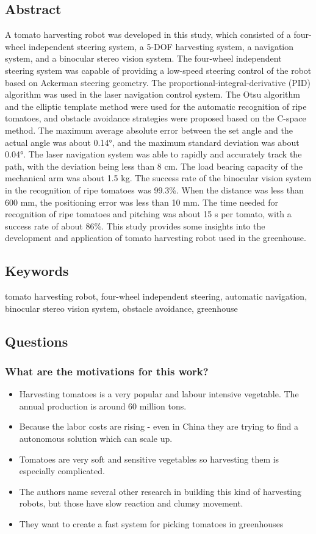 \subsection*{Abstract}
A tomato harvesting robot was developed in this study, which consisted of a four-wheel independent steering system,
a 5-DOF harvesting system, a navigation system, and a binocular stereo vision system.
The four-wheel independent steering system was capable of providing a low-speed steering control of the robot based on Ackerman steering geometry.
The proportional-integral-derivative (PID) algorithm was used in the laser navigation control system. The Otsu algorithm and the
elliptic template method were used for the automatic recognition of ripe tomatoes, and obstacle avoidance strategies were
proposed based on the C-space method. The maximum average absolute error between the set angle and the actual angle was
about 0.14°, and the maximum standard deviation was about 0.04°.  The laser navigation system was able to rapidly and
accurately track the path, with the deviation being less than 8 cm.  The load bearing capacity of the mechanical arm was about
1.5 kg. The success rate of the binocular vision system in the recognition of ripe tomatoes was 99.3\%.
When the distance was less than 600 mm, the positioning error was less than 10 mm.
The time needed for recognition of ripe tomatoes and pitching was about 15 s per tomato, with a success rate of about 86\%. 
This study provides some insights into the development and application of tomato harvesting robot used in the greenhouse.


\subsection*{Keywords}
tomato harvesting robot, four-wheel independent steering, automatic navigation, binocular stereo vision system,
obstacle avoidance, greenhouse

\subsection*{Questions}

\subsubsection*{What are the motivations for this work?}
\begin{itemize}
    \item Harvesting tomatoes is a very popular and labour intensive vegetable. The annual production is around 60 million tons. 
    \item Because the labor costs are rising - even in China they are trying to find a autonomous solution which can scale up.
    \item Tomatoes are very soft and sensitive vegetables so harvesting them is especially complicated.
    \item The authors name several other research in building this kind of harvesting robots, but those have slow reaction and clumsy movement. 
    \item They want to create a fast system for picking tomatoes in greenhouses
\end{itemize}
